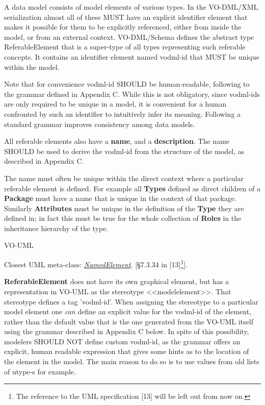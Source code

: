\documentclass[10pt,a4paper]{ivoa}
\begin{document}
A data model consists of model elements of various types. In the
VO-DML/XML serialization almost all of these MUST have an explicit
identifier element that makes it possible for them to be explicitly
referenced, either from inside the model, or from an external context.
VO-DML/Schema defines the abstract type ReferableElement that is a
super-type of all types representing such referable concepts. It
contains an identifier element named vodml-id that MUST be unique within
the model.

Note that for convenience vodml-id SHOULD be human-readable, following
to the grammar defined in Appendix C. While this is not obligatory,
since vodml-ids are only required to be unique in a model, it is
convenient for a human confronted by such an identifier to intuitively
infer its meaning. Following a standard grammar improves consistency
among data models.

All referable elements also have a \textbf{name}, and a
\textbf{description}. The name SHOULD be used to derive the vodml-id
from the structure of the model, as described in Appendix C.

The name must often be unique within the direct context where a
particular referable element is defined. For example all \textbf{Types}
defined as direct children of a \textbf{Package} must have a name that
is unique in the context of that package. Similarly \textbf{Attributes}
must be unique in the definition of the \textbf{Type} they are defined
in; in fact this must be true for the whole collection of \textbf{Roles}
in the inheritance hierarchy of the type.

VO-UML

Closest UML meta-class:
\href{http://www.uml-diagrams.org/uml-core.html\#named-element}{\emph{NamedElement}}.
{[}§7.3.34 in {[}13{]}\footnote{The reference to the UML specification
  {[}13{]} will be left out from now on.}{]}.

\textbf{ReferableElement} does not have its own graphical element, but
has a representation in VO-UML as the stereotype
\textless\textless modelelement\textgreater\textgreater. That stereotype
defines a tag 'vodml-id'. When assigning the stereotype to a particular
model element one \emph{can} define an explicit value for the vodml-id
of the element, rather than the default value that is the one generated
from the VO-UML itself using the grammar described in Appendix C below.
In spite of this possibility, modelers SHOULD NOT define custom
vodml-id, as the grammar offers an explicit, human readable expression
that gives some hints as to the location of the element in the model.
The main reason to do so is to use values from old lists of utype-s for
example.
\end{document}
